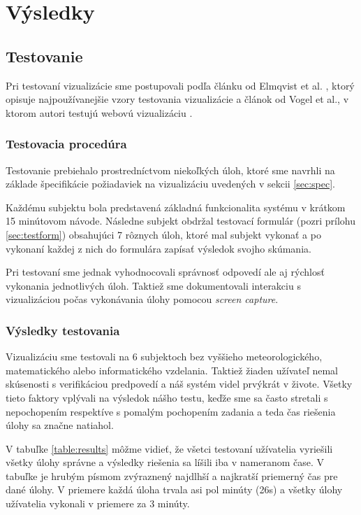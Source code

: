 \chapter{Výsledky}

\section{Testovanie}
Pri testovaní vizualizácie sme postupovali podľa článku od Elmqvist et al. \cite{Patterns}, ktorý opisuje najpoužívanejšie vzory testovania vizualizácie a článok od Vogel et al., v ktorom autori testujú webovú vizualizáciu \cite{WebBasedUserTest}.

\subsection{Testovacia procedúra}
Testovanie prebiehalo prostredníctvom niekoľkých úloh, ktoré sme navrhli na základe špecifikácie požiadaviek na vizualizáciu uvedených v sekcii \ref{sec:spec}. 

Každému subjektu bola predstavená základná funkcionalita systému v krátkom 15 minútovom návode. Následne subjekt obdržal testovací formulár (pozri prílohu \ref{sec:testform}) obsahujúci 7 rôznych úloh, ktoré mal subjekt vykonať a po vykonaní každej z nich do formulára zapísať výsledok svojho skúmania.

Pri testovaní sme jednak vyhodnocovali správnosť odpovedí ale aj rýchlosť vykonania jednotlivých úloh. Taktiež sme dokumentovali interakciu s vizualizáciou počas vykonávania úlohy pomocou \textit{screen capture}.

\subsection{Výsledky testovania}

Vizualizáciu sme testovali na 6 subjektoch bez vyššieho meteorologického, matematického alebo informatického vzdelania. Taktiež žiaden užívateľ nemal skúsenosti s verifikáciou predpovedí a náš systém videl prvýkrát v živote. Všetky tieto faktory vplývali na výsledok nášho testu, keďže sme sa často stretali s nepochopením respektíve s pomalým pochopením zadania a teda čas riešenia úlohy sa značne natiahol.

V tabuľke \ref{table:results} môžme vidieť, že všetci testovaní užívatelia vyriešili všetky úlohy správne a výsledky riešenia sa líšili iba v nameranom čase. V tabuľke je hrubým písmom zvýraznený najdlhší a najkratší priemerný čas pre dané úlohy. 
V priemere každá úloha trvala asi pol minúty (26s) a všetky úlohy užívatelia vykonali v priemere za 3 minúty.


